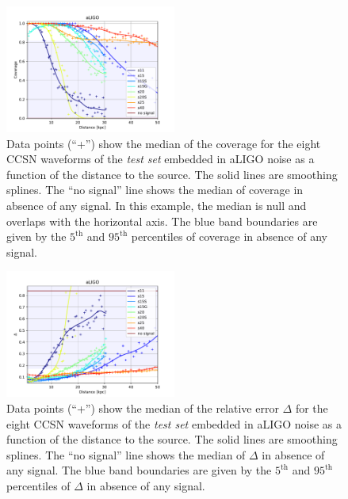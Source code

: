 \begin{figure}[t]
  \centering
  \includegraphics[width=0.5\textwidth]{plots/aLIGO_coverage_allwvfs}
 \caption{Data points (``+'') show the median of the coverage for the eight CCSN waveforms of the {\it test set} embedded in aLIGO noise as a function of the  distance to the source. The solid lines are smoothing splines. The ``no signal'' line shows the median of coverage in absence of any signal. In this example, the median is null and overlaps with the horizontal axis. The blue band boundaries are given by the $\mathrm{5^{th}}$ and $\mathrm{95^{th}}$ percentiles of coverage in absence of any signal.} \label{fig:aLIGO_cov_allwvf}
\end{figure}

\begin{figure}[t]
  \centering
  \includegraphics[width=0.5\textwidth]{plots/aLIGO_delta_allwvfs}
  \caption{Data points (``+'') show the median of the relative error $\Delta$ for the eight CCSN waveforms of the {\it test set} embedded in aLIGO noise as a function of the distance to the source. The solid lines are smoothing splines. The ``no signal'' line shows the median of $\Delta$ in absence of any signal. The blue band boundaries are given by the $\mathrm{5^{th}}$ and $\mathrm{95^{th}}$ percentiles of $\Delta$ in absence of any signal.}\label{fig:aLIGO_prec_allwvf}
\end{figure}

